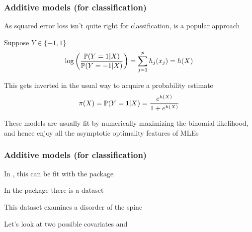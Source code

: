 \documentclass[12pt]{beamer}
\begin{document}
\title{}
\subtitle{\classTitle}
\date{}



\begin{frame}
\maketitle

\organization
%
\end{frame}


\begin{frame}[fragile]
\frametitle{Additive models (for classification)}
As squared error loss isn't quite right for classification,  is a popular approach

\vsp
Suppose $Y \in \{-1,1\}$
\[
\log \left(\frac{\P(Y= 1| X)}{\P(Y = -1 | X)} \right)= \sum_{j=1}^p h_j(x_j) = h(X)
\]

\vsp
This gets inverted in the usual way to acquire a probability estimate
\[
\pi(X) = \P(Y = 1|X) = \frac{e^{h(X)}}{1 + e^{h(X)}}
\]

\vsp
These models are usually fit by numerically maximizing the binomial likelihood, and hence
enjoy all the asymptotic optimality features of MLEs
\end{frame}

%
%
%
%
\begin{frame}[fragile]
\frametitle{Additive models (for classification)}
In , this can be fit with the package 

\vsp
In the  package there is a dataset 

\vsp
This dataset examines a disorder of the spine

\vsp
Let's look at two possible covariates  and 

\end{frame}
\end{document}

